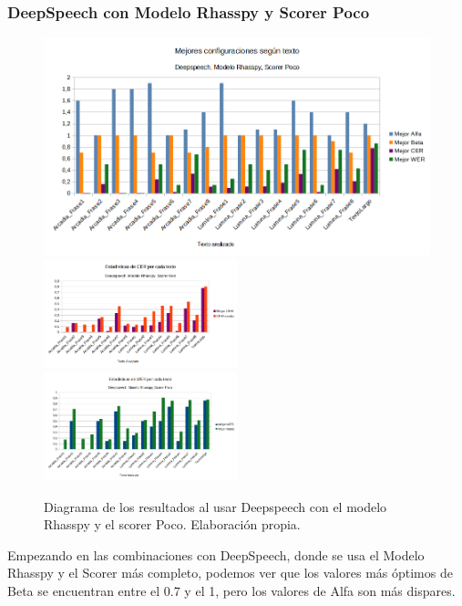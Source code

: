 \newpage

\subsubsection{DeepSpeech con Modelo Rhasspy y Scorer Poco}

\begin{figure}[H]
	\includegraphics[width=\textwidth]{imagenes/MejoresResultados_DeepSpeechIvanPocoRhasspy.png} \\
	\includegraphics[width=0.5\textwidth]{imagenes/CER_DeepSpeechIvanPocoRhasspy.png} \hfill \includegraphics[width=0.5\textwidth]{imagenes/WER_DeepspeechIvanPocoRhasspy.png}
	\caption[Diagramas de Alfa, Beta, WER y CER - Rhasspy y Ken]{Diagrama de los resultados al usar Deepspeech con el modelo Rhasspy y el scorer Poco. Elaboración propia.}
\end{figure}

Empezando en las combinaciones con DeepSpeech, donde se usa el Modelo Rhasspy y el Scorer más completo, podemos ver que los valores más óptimos de Beta se encuentran entre el 0.7 y el 1, pero los valores de Alfa son más dispares. 

